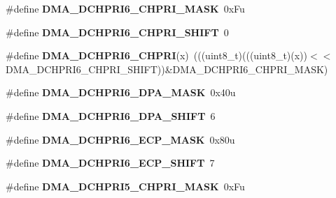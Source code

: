\begin{DoxyCompactItemize}
\item 
\#define {\bfseries D\+M\+A\+\_\+\+D\+C\+H\+P\+R\+I6\+\_\+\+C\+H\+P\+R\+I\+\_\+\+M\+A\+SK}~0x\+Fu\hypertarget{group__DMA__Register__Masks_ga30dc9b09d09c54838004e9c23a16c6b7}{}\label{group__DMA__Register__Masks_ga30dc9b09d09c54838004e9c23a16c6b7}

\item 
\#define {\bfseries D\+M\+A\+\_\+\+D\+C\+H\+P\+R\+I6\+\_\+\+C\+H\+P\+R\+I\+\_\+\+S\+H\+I\+FT}~0\hypertarget{group__DMA__Register__Masks_gac12a93574812e9019f2e7dc31e844205}{}\label{group__DMA__Register__Masks_gac12a93574812e9019f2e7dc31e844205}

\item 
\#define {\bfseries D\+M\+A\+\_\+\+D\+C\+H\+P\+R\+I6\+\_\+\+C\+H\+P\+RI}(x)~(((uint8\+\_\+t)(((uint8\+\_\+t)(x))$<$$<$D\+M\+A\+\_\+\+D\+C\+H\+P\+R\+I6\+\_\+\+C\+H\+P\+R\+I\+\_\+\+S\+H\+I\+FT))\&D\+M\+A\+\_\+\+D\+C\+H\+P\+R\+I6\+\_\+\+C\+H\+P\+R\+I\+\_\+\+M\+A\+SK)\hypertarget{group__DMA__Register__Masks_gabc1596123bcd7d1c8072729515b44d0f}{}\label{group__DMA__Register__Masks_gabc1596123bcd7d1c8072729515b44d0f}

\item 
\#define {\bfseries D\+M\+A\+\_\+\+D\+C\+H\+P\+R\+I6\+\_\+\+D\+P\+A\+\_\+\+M\+A\+SK}~0x40u\hypertarget{group__DMA__Register__Masks_gaf4b1d9494691bb0d118593c119789378}{}\label{group__DMA__Register__Masks_gaf4b1d9494691bb0d118593c119789378}

\item 
\#define {\bfseries D\+M\+A\+\_\+\+D\+C\+H\+P\+R\+I6\+\_\+\+D\+P\+A\+\_\+\+S\+H\+I\+FT}~6\hypertarget{group__DMA__Register__Masks_gaeb900ebd7efd790f06ce39a68735defa}{}\label{group__DMA__Register__Masks_gaeb900ebd7efd790f06ce39a68735defa}

\item 
\#define {\bfseries D\+M\+A\+\_\+\+D\+C\+H\+P\+R\+I6\+\_\+\+E\+C\+P\+\_\+\+M\+A\+SK}~0x80u\hypertarget{group__DMA__Register__Masks_gaa5c231f95cecf67801dc43ea987a5caf}{}\label{group__DMA__Register__Masks_gaa5c231f95cecf67801dc43ea987a5caf}

\item 
\#define {\bfseries D\+M\+A\+\_\+\+D\+C\+H\+P\+R\+I6\+\_\+\+E\+C\+P\+\_\+\+S\+H\+I\+FT}~7\hypertarget{group__DMA__Register__Masks_ga467da6c912746a19226a13ba1d2ff1c1}{}\label{group__DMA__Register__Masks_ga467da6c912746a19226a13ba1d2ff1c1}

\item 
\#define {\bfseries D\+M\+A\+\_\+\+D\+C\+H\+P\+R\+I5\+\_\+\+C\+H\+P\+R\+I\+\_\+\+M\+A\+SK}~0x\+Fu\hypertarget{group__DMA__Register__Masks_ga4f7ea16f3982b598833ea289b6af08e1}{}\label{group__DMA__Register__Masks_ga4f7ea16f3982b598833ea289b6af08e1}


\end{DoxyCompactItemize}
